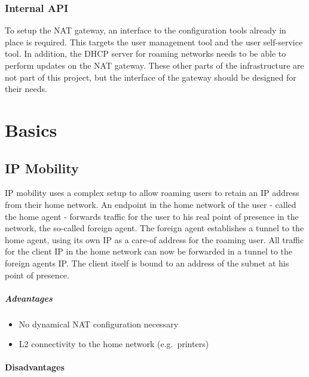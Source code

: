 \documentclass{report}
\begin{document}
\subsection{Internal API}\label{internal-api}

To setup the NAT gateway, an interface to the configuration tools already in
place is required. This targets the user management tool and the user
self-service tool. In addition, the DHCP server for roaming
networks needs to be able to perform updates on the NAT gateway. These
other parts of the infrastructure are not part of this project, but the
interface of the gateway should be designed for their needs.

\chapter{Basics}\label{basics}

\section{IP Mobility}\label{ip-mobility}

IP mobility\cite{IPMob}\cite{MobileIP-cisco} uses a complex setup to allow roaming users to retain an
IP address from their home network. An endpoint in the home network of the
user - called the home agent - forwards traffic for the user to his real
point of presence in the network, the so-called foreign agent. The
foreign agent establishes a tunnel to the home agent, using its own IP
as a care-of address for the roaming user. All traffic for the client IP in the home network
can now be forwarded in a tunnel to the foreign agents IP. The client
itself is bound to an address of the subnet at his point of presence.

\paragraph{Advantages}\label{pro}

\begin{itemize}
\itemsep1pt\parskip0pt
\item
  No dynamical NAT configuration necessary
\item
  L2 connectivity to the home network (e.g.~printers)
\end{itemize}

\subsubsection{Disadvantages}\label{con}
\end{document}
